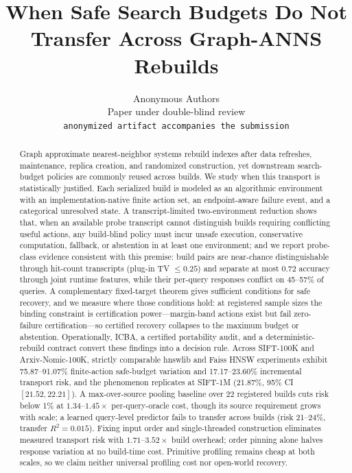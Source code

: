 \documentclass{article}
\title{When Safe Search Budgets Do Not Transfer Across Graph-ANNS Rebuilds}
\author{Anonymous Authors\\
Paper under double-blind review\\
\texttt{anonymized artifact accompanies the submission}}
\begin{document}
\maketitle

\begin{abstract}
Graph approximate nearest-neighbor systems rebuild indexes after data refreshes, maintenance, replica
creation, and randomized construction, yet downstream search-budget policies are commonly reused across
builds. We study when this transport is statistically justified. Each serialized build is modeled as an
algorithmic environment with an implementation-native finite action set, an endpoint-aware failure event,
and a categorical unresolved state. A transcript-limited two-environment reduction shows that, when an
available probe transcript cannot distinguish builds requiring conflicting useful actions, any build-blind
policy must incur unsafe execution, conservative computation, fallback, or abstention in at least one
environment; and we report probe-class evidence consistent with this premise: build pairs are
near-chance distinguishable through hit-count transcripts (plug-in TV $\le0.25$) and separate at most
$0.72$ accuracy through joint runtime features, while their per-query responses conflict on 45--57\% of
queries. A complementary fixed-target theorem gives sufficient conditions for safe recovery, and
we measure where those conditions hold: at registered sample sizes the binding constraint is
certification power---margin-band actions exist but fail zero-failure certification---so certified recovery
collapses to the maximum budget or abstention. Operationally, ICBA, a
certified portability audit, and a deterministic-rebuild contract convert these findings into a decision
rule. Across SIFT-100K and Arxiv-Nomic-100K, strictly comparable hnswlib and Faiss HNSW experiments exhibit
75.87--91.07\% finite-action safe-budget variation and 17.17--23.60\% incremental transport risk, and the
phenomenon replicates at SIFT-1M (21.87\%, 95\% CI $[21.52, 22.21]$). A max-over-source pooling baseline over
22 registered builds cuts risk below 1\% at $1.34$--$1.45\times$ per-query-oracle cost, though its source
requirement grows with scale; a learned query-level predictor fails to transfer across builds (risk 21--24\%,
transfer $R^2 = 0.015$). Fixing input order and single-threaded construction eliminates measured transport
risk with $1.71$--$3.52\times$ build overhead; order pinning alone halves response variation at no build-time
cost. Primitive profiling remains cheap at both scales, so we claim neither universal profiling cost nor
open-world recovery.
\end{abstract}
\end{document}
